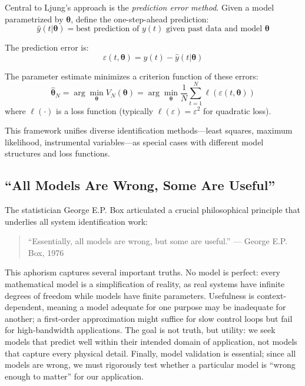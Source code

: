 Central to Ljung's approach is the \textit{prediction error method}. Given a model parametrized by $\boldsymbol{\theta}$, define the one-step-ahead prediction:
\begin{equation}
\hat{y}(t|\boldsymbol{\theta}) = \text{best prediction of } y(t) \text{ given past data and model } \boldsymbol{\theta}
\end{equation}

The prediction error is:
\begin{equation}
\varepsilon(t, \boldsymbol{\theta}) = y(t) - \hat{y}(t|\boldsymbol{\theta})
\end{equation}

The parameter estimate minimizes a criterion function of these errors:
\begin{equation}
\hat{\boldsymbol{\theta}}_N = \arg\min_{\boldsymbol{\theta}} V_N(\boldsymbol{\theta}) = \arg\min_{\boldsymbol{\theta}} \frac{1}{N} \sum_{t=1}^{N} \ell\left(\varepsilon(t, \boldsymbol{\theta})\right)
\label{eq:pem}
\end{equation}
where $\ell(\cdot)$ is a loss function (typically $\ell(\varepsilon) = \varepsilon^2$ for quadratic loss).

This framework unifies diverse identification methods---least squares, maximum likelihood, instrumental variables---as special cases with different model structures and loss functions.

\subsection{``All Models Are Wrong, Some Are Useful''}
\label{subsec:box}

The statistician George E.P. Box articulated a crucial philosophical principle that underlies all system identification work:

\begin{quote}
``Essentially, all models are wrong, but some are useful.'' --- George E.P. Box, 1976
\end{quote}

This aphorism captures several important truths. No model is perfect: every mathematical model is a simplification of reality, as real systems have infinite degrees of freedom while models have finite parameters. Usefulness is context-dependent, meaning a model adequate for one purpose may be inadequate for another; a first-order approximation might suffice for slow control loops but fail for high-bandwidth applications. The goal is not truth, but utility: we seek models that predict well within their intended domain of application, not models that capture every physical detail. Finally, model validation is essential; since all models are wrong, we must rigorously test whether a particular model is ``wrong enough to matter'' for our application.

